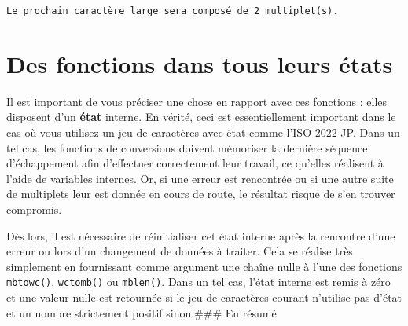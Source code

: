 \documentclass[]{article}
\begin{document}
\begin{verbatim}
Le prochain caractère large sera composé de 2 multiplet(s).
\end{verbatim}

\section{Des fonctions dans tous leurs
états}\label{des-fonctions-dans-tous-leurs-uxe9tats}

Il est important de vous préciser une chose en rapport avec ces
fonctions : elles disposent d'un \textbf{état} interne. En vérité, ceci
est essentiellement important dans le cas où vous utilisez un jeu de
caractères avec état comme l'ISO-2022-JP. Dans un tel cas, les fonctions
de conversions doivent mémoriser la dernière séquence d'échappement afin
d'effectuer correctement leur travail, ce qu'elles réalisent à l'aide de
variables internes. Or, si une erreur est rencontrée ou si une autre
suite de multiplets leur est donnée en cours de route, le résultat
risque de s'en trouver compromis.

Dès lors, il est nécessaire de réinitialiser cet état interne après la
rencontre d'une erreur ou lors d'un changement de données à traiter.
Cela se réalise très simplement en fournissant comme argument une chaîne
nulle à l'une des fonctions \texttt{mbtowc()}, \texttt{wctomb()} ou
\texttt{mblen()}. Dans un tel cas, l'état interne est remis à zéro et
une valeur nulle est retournée si le jeu de caractères courant n'utilise
pas d'état et un nombre strictement positif sinon.\#\#\# En résumé
\end{document}
